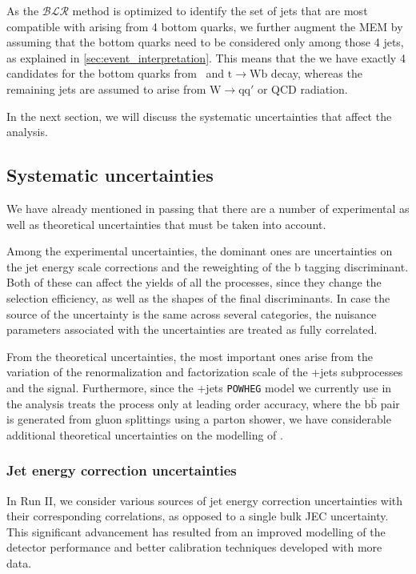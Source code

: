 As the $\mathcal{BLR}$ method is optimized to identify the set of jets that are most compatible with arising from 4 bottom quarks, we further augment the MEM by assuming that the bottom quarks need to be considered only among those 4 jets, as explained in \cref{sec:event_interpretation}. This means that the we have exactly 4 candidates for the bottom quarks from \Hbb~and $\mathrm{t} \rightarrow \mathrm{W} \mathrm{b}$ decay, whereas the remaining jets are assumed to arise from $\mathrm{W} \rightarrow \mathrm{q} \mathrm{q}'$ or QCD radiation. 

In the next section, we will discuss the systematic uncertainties that affect the analysis.

\subsection{Systematic uncertainties}
\label{sec:systematic_unc}
We have already mentioned in passing that there are a number of experimental as well as theoretical uncertainties that must be taken into account.

Among the experimental uncertainties, the dominant ones are uncertainties on the jet energy scale corrections and the reweighting of the b tagging discriminant. Both of these can affect the yields of all the processes, since they change the selection efficiency, as well as the shapes of the final discriminants. In case the source of the uncertainty is the same across several categories, the nuisance parameters associated with the uncertainties are treated as fully correlated.

From the theoretical uncertainties, the most important ones arise from the variation of the renormalization and factorization scale of the \ttbar+jets subprocesses and the \ttH signal. Furthermore, since the \ttbar+jets \texttt{POWHEG} model we currently use in the analysis treats the \ttbb process only at leading order accuracy, where the $\mathrm{b}\bar{\mathrm{b}}$ pair is generated from gluon splittings using a parton shower, we have considerable additional theoretical uncertainties on the modelling of \ttbb.

\subsubsection{Jet energy correction uncertainties}
In Run II, we consider various sources of jet energy correction uncertainties with their corresponding correlations, as opposed to a single bulk JEC uncertainty. This significant advancement has resulted from an improved modelling of the detector performance and better calibration techniques developed with more data. 

